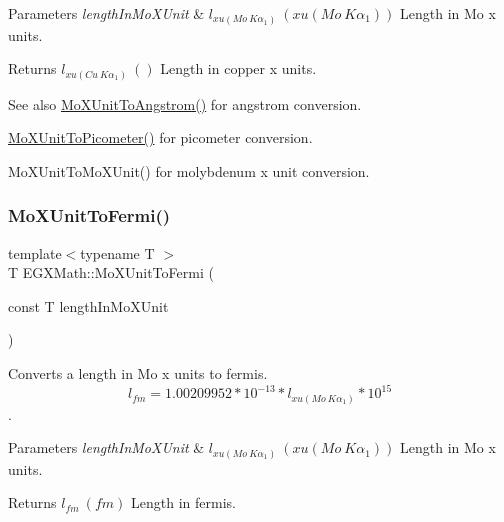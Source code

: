 \begin{DoxyParams}{Parameters}
{\em length\+In\+Mo\+X\+Unit} & $ l_{xu(Mo\ K\alpha_1)}\ (xu(Mo\ K\alpha_1))$ Length in Mo x units. \\
\hline
\end{DoxyParams}
\begin{DoxyReturn}{Returns}
$ l_{xu(Cu\ K\alpha_1)}\ ()$ Length in copper x units. 
\end{DoxyReturn}
\begin{DoxySeeAlso}{See also}
\mbox{\hyperlink{group___e_g_x_math-_conversions-_length_conversions-_non-_s_i-_mo_x_unit-_non-_s_i_ga1846652500863bdef905f209f3c5e0ae}{Mo\+X\+Unit\+To\+Angstrom()}} for angstrom conversion. 

\mbox{\hyperlink{group___e_g_x_math-_conversions-_length_conversions-_non-_s_i-_mo_x_unit-_s_i_ga9b06995f2d8ddd611999e65539f0896c}{Mo\+X\+Unit\+To\+Picometer()}} for picometer conversion. 

Mo\+X\+Unit\+To\+Mo\+X\+Unit() for molybdenum x unit conversion. 
\end{DoxySeeAlso}
\mbox{\label{group___e_g_x_math-_conversions-_length_conversions-_non-_s_i-_mo_x_unit-_non-_s_i_gac8cb731cb2dd7df67818cade6f80c011}} 
\subsubsection{\texorpdfstring{Mo\+X\+Unit\+To\+Fermi()}{MoXUnitToFermi()}}
{\footnotesize\ttfamily template$<$typename T $>$ \\
T E\+G\+X\+Math\+::\+Mo\+X\+Unit\+To\+Fermi (\begin{DoxyParamCaption}\item[{const T}]{length\+In\+Mo\+X\+Unit }\end{DoxyParamCaption})}



Converts a length in Mo x units to fermis. \[ l_{fm}=1.00209952*10^{-13} * l_{xu(Mo\ K\alpha_1)} * 10^{15} \]. 


\begin{DoxyParams}{Parameters}
{\em length\+In\+Mo\+X\+Unit} & $ l_{xu(Mo\ K\alpha_1)}\ (xu(Mo\ K\alpha_1))$ Length in Mo x units. \\
\hline
\end{DoxyParams}
\begin{DoxyReturn}{Returns}
$ l_{fm}\ (fm)$ Length in fermis. 
\end{DoxyReturn}
\mbox{\label{group___e_g_x_math-_conversions-_length_conversions-_non-_s_i-_mo_x_unit-_non-_s_i_ga8fa37a1f86f7b01d2ca395fb7d2b75ce}} 
